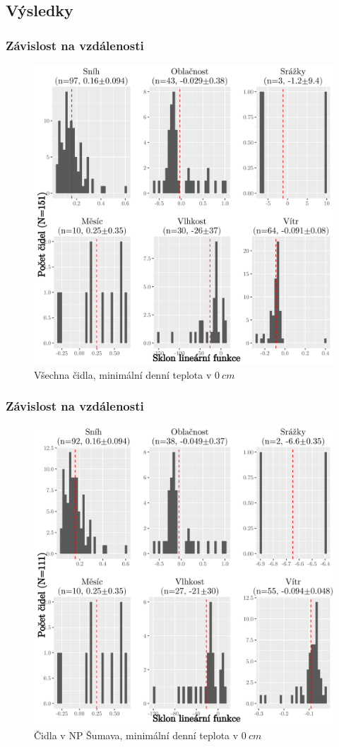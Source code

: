 \documentclass[
	11pt, %
]{beamer}
\begin{document}
\subsection{Výsledky}

\begin{frame}
	\frametitle{Závislost na vzdálenosti}
	\begin{figure}
		\includegraphics[width=0.8\linewidth,height=0.6\textwidth]{all151minTall0cm_BWyes.png}
		\caption{Všechna čidla, minimální denní teplota v $\SI{0}{cm}$}
	\end{figure}
\end{frame}

\begin{frame}
	\frametitle{Závislost na vzdálenosti}
	\begin{figure}
		\includegraphics[width=0.8\linewidth,height=0.6\textwidth]{all111minTall0cm_BWno.png}
		\caption{Čidla v NP Šumava, minimální denní teplota v $\SI{0}{cm}$}
	\end{figure}
\end{frame}
\end{document}
